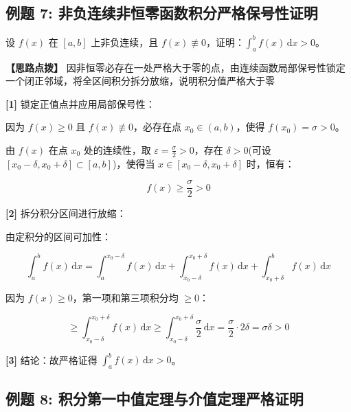 \documentclass[11pt,a4paper,UTF8]{ctexart}
\begin{document}
\subsection{例题 7: 非负连续非恒零函数积分严格保号性证明}

设 $f(x)$ 在 $[a, b]$ 上非负连续，且 $f(x) \not\equiv 0$，证明：$\int_a^b f(x)\,\mathrm{d}x > 0$。

\textbf{\color{DeepPurple}【思路点拨】} 因非恒零必存在一处严格大于零的点，由连续函数局部保号性锁定一个闭正邻域，将全区间积分拆分放缩，说明积分值严格大于零


\begin{solbox}[分步推导与答题规范]
\textbf{[1]} 锁定正值点并应用局部保号性：

因为 $f(x) \geqslant 0$ 且 $f(x) \not\equiv 0$，必存在点 $x_0 \in (a, b)$，使得 $f(x_0) = \sigma > 0$。

由 $f(x)$ 在点 $x_0$ 处的连续性，取 $\varepsilon = \frac{\sigma}{2} > 0$，存在 $\delta > 0$(可设 $[x_0-\delta, x_0+\delta] \subset [a, b]$)，使得当 $x \in [x_0-\delta, x_0+\delta]$ 时，恒有：


\begin{equation*}
f(x) \geqslant \frac{\sigma}{2} > 0
\end{equation*}


\textbf{[2]} 拆分积分区间进行放缩：

由定积分的区间可加性：


\begin{equation*}
\int_a^b f(x)\,\mathrm{d}x = \int_a^{x_0-\delta} f(x)\,\mathrm{d}x + \int_{x_0-\delta}^{x_0+\delta} f(x)\,\mathrm{d}x + \int_{x_0+\delta}^b f(x)\,\mathrm{d}x
\end{equation*}


因为 $f(x) \geqslant 0$，第一项和第三项积分均 $\geqslant 0$：


\begin{equation*}
\geqslant \int_{x_0-\delta}^{x_0+\delta} f(x)\,\mathrm{d}x \geqslant \int_{x_0-\delta}^{x_0+\delta} \frac{\sigma}{2}\,\mathrm{d}x = \frac{\sigma}{2} \cdot 2\delta = \sigma \delta > 0
\end{equation*}


\textbf{[3]} 结论：故严格证得 $\int_a^b f(x)\,\mathrm{d}x > 0$。
\end{solbox}


\subsection{例题 8: 积分第一中值定理与介值定理严格证明}
\end{document}
